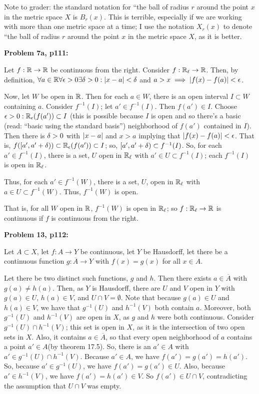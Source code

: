 \documentclass[a4paper,12pt]{article}
\begin{document}
Note to grader: the standard notation for ``the ball of radius $r$ around the point $x$ in the metric space $X$ is $B_r(x)$. This is terrible, especially if we are working with more than one metric space at a time; I use the notation $X_r(x)$ to denote ``the ball of radius $r$ around the point $x$ in the metric space $X$, as it is better. 

{\bf Problem 7a, p111:}

Let $f: \mathbb{R} \to \mathbb{R}$ be continuous from the right. Consider $f: \mathbb{R}_{\ell} \to \mathbb{R}$. Then, by definition, $\forall a \in \mathbb{R}\forall \epsilon >0 \exists \delta > 0 : \left\lvert x-a \right\rvert < \delta$ and $a > x \implies \left\lvert f(x) - f(a) \right\rvert < \epsilon$.

Now, let $W$ be open in $\mathbb{R}$. Then for each $a \in W$, there is an open interval $I \subset W$ containing $a$. Consider $f^{-1}(I)$; let $a' \in f^{-1}(I)$. Then $f(a') \in I$. Choose $\epsilon >0: \mathbb{R}_{\epsilon}(f(a')) \subset I$ (this is possible because $I$ is open and so there's a basic (read: ``basic using the standard basis'') neighborhood of $f(a')$ contained in $I$). Then there is $\delta>0$ with $\left\lvert x-a \right\rvert$ and $x >a$ implying that $\left\lvert f(x) - f(a) \right\rvert < \epsilon$. That is, $f([a', a'+ \delta)) \subset \mathbb{R}_{\epsilon}(f(a')) \subset I$; so, $[a',a'+\delta) \subset f^{-1}(I)$. So, for each $a' \in f^{-1}(I)$, there is a set, $U$ open in $\mathbb{R}_\ell$ with $a' \in U \subset f^{-1}(I)$; each $f^{-1}(I)$ is open in $\mathbb{R}_\ell$.


Thus, for each $a' \in f^{-1}(W)$, there is a set, $U$, open in $\mathbb{R}_\ell$ with $a \in U \subset f^{-1}(W)$. Thus, $f^{-1}(W)$ is open.

That is, for all $W$ open in $\mathbb{R}$, $f^{-1}(W)$ is open in $\mathbb{R}_{\ell}$; so $f: \mathbb{R}_\ell \to \mathbb{R}$ is continuous if $f$ is continuous from the right.

\shunt

{\bf Problem 13, p112:}

Let $A \subset X$, let $f: A \to Y$ be continuous, let $Y$ be Hausdorff, let there be a continuous function $g: \overline{A} \to Y$ with $f(x) = g(x)$ for all $x \in A$.

Let there be two distinct such functions, $g$ and $h$. Then there exists $a \in \overline{A}$ with $g(a) \neq h(a)$. Then, as $Y$ is Hausdorff, there are $U$ and $V$ open in $Y$ with $g(a) \in U$, $h(a) \in V$, and $U \cap V = \emptyset$. Note that because $g(a) \in U$ and $h(a) \in V$, we have that $g^{-1}(U)$ and $h^{-1}(V)$ both contain $a$. Moreover, both $g^{-1}(U)$ and $h^{-1}(V)$ are open in $X$, as $g$ and $h$ were both continuous. Consider $g^{-1}(U) \cap h^{-1}(V)$; this set is open in $X$, as it is the intersection of two open sets in $X$. Also, it contains $a \in \overline{A}$, so that every open neighborhood of $a$ contains a point $a' \in A$(by theorem 17.5). So, there is an $a' \in A$ with $a' \in g^{-1}(U) \cap h^{-1}(V)$. Because $a' \in A$, we have $f(a') = g(a') = h(a')$. So, because $a' \in g^{-1}(U)$, we have $f(a') = g(a') \in U$. Also, because $a' \in h^{-1}(V)$, we have $f(a') = h(a') \in V$. So $f(a') \in U \cap V$, contradicting the assumption that $U \cap V$ was empty.
\end{document}
